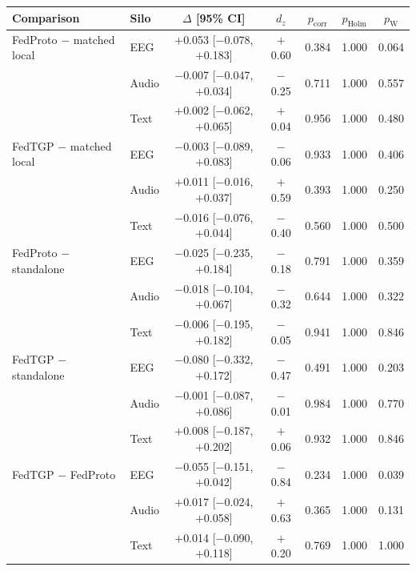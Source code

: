\begin{tabular}{llccccc}
\toprule
\textbf{Comparison} & \textbf{Silo} & \textbf{$\Delta$ [95\% CI]} & \textbf{$d_z$} & \textbf{$p_{\mathrm{corr}}$} & \textbf{$p_{\mathrm{Holm}}$} & \textbf{$p_{\mathrm{W}}$} \\
\midrule
FedProto $-$ matched local & EEG & $+$0.053 [$-$0.078, $+$0.183] & $+$0.60 & 0.384 & 1.000 & 0.064 \\
 & Audio & $-$0.007 [$-$0.047, $+$0.034] & $-$0.25 & 0.711 & 1.000 & 0.557 \\
 & Text & $+$0.002 [$-$0.062, $+$0.065] & $+$0.04 & 0.956 & 1.000 & 0.480 \\
\midrule
FedTGP $-$ matched local & EEG & $-$0.003 [$-$0.089, $+$0.083] & $-$0.06 & 0.933 & 1.000 & 0.406 \\
 & Audio & $+$0.011 [$-$0.016, $+$0.037] & $+$0.59 & 0.393 & 1.000 & 0.250 \\
 & Text & $-$0.016 [$-$0.076, $+$0.044] & $-$0.40 & 0.560 & 1.000 & 0.500 \\
\midrule
FedProto $-$ standalone & EEG & $-$0.025 [$-$0.235, $+$0.184] & $-$0.18 & 0.791 & 1.000 & 0.359 \\
 & Audio & $-$0.018 [$-$0.104, $+$0.067] & $-$0.32 & 0.644 & 1.000 & 0.322 \\
 & Text & $-$0.006 [$-$0.195, $+$0.182] & $-$0.05 & 0.941 & 1.000 & 0.846 \\
\midrule
FedTGP $-$ standalone & EEG & $-$0.080 [$-$0.332, $+$0.172] & $-$0.47 & 0.491 & 1.000 & 0.203 \\
 & Audio & $-$0.001 [$-$0.087, $+$0.086] & $-$0.01 & 0.984 & 1.000 & 0.770 \\
 & Text & $+$0.008 [$-$0.187, $+$0.202] & $+$0.06 & 0.932 & 1.000 & 0.846 \\
\midrule
FedTGP $-$ FedProto & EEG & $-$0.055 [$-$0.151, $+$0.042] & $-$0.84 & 0.234 & 1.000 & 0.039 \\
 & Audio & $+$0.017 [$-$0.024, $+$0.058] & $+$0.63 & 0.365 & 1.000 & 0.131 \\
 & Text & $+$0.014 [$-$0.090, $+$0.118] & $+$0.20 & 0.769 & 1.000 & 1.000 \\
\bottomrule
\end{tabular}